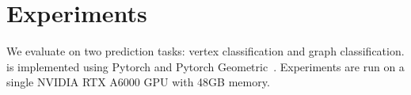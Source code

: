 




\section{Experiments}
We evaluate \model{} on two prediction tasks: vertex classification and graph classification.
\model{} is implemented using Pytorch and Pytorch Geometric~\citep{fey2019fast}. Experiments are run on a single NVIDIA RTX A6000 GPU with 48GB memory.

